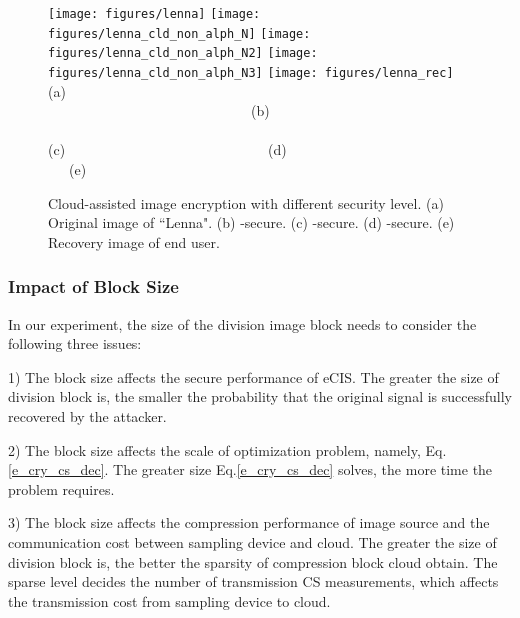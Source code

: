 \documentclass[conference]{IEEEtran}
\begin{document}
\begin{figure*}[t]
\begin{center}
  \texttt{[image: figures/lenna]}
  \texttt{[image: figures/lenna\_cld\_non\_alph\_N]}
  \texttt{[image: figures/lenna\_cld\_non\_alph\_N2]}
  \texttt{[image: figures/lenna\_cld\_non\_alph\_N3]}
  \texttt{[image: figures/lenna\_rec]}\\
 {\footnotesize (a) ~~~~~~~~~~~~~~~~~~~~~~~~~~~~~(b)~~~~~~~~~~~~~~~~~~~~~~~~~~~~~ (c)~~~~~~~~~~~~~~~~~~~~~~~~~~~~~(d)~~~~~~~~~~~~~~~~~~~~~~~~~~~~~(e) }\\
  \caption{{\footnotesize Cloud-assisted image encryption with different security level. (a) Original image of ``Lenna". (b) -secure. (c)  -secure. (d)  -secure. (e) Recovery image of end user.}}\label{f_se_uniform}
  \end{center}
\end{figure*}

\subsubsection{Impact of Block Size}
In our experiment, the size of the division image block needs to consider the following three issues:

 1) The block size affects the secure performance of eCIS. The greater the size of division block is, the smaller the probability that the original signal is successfully recovered by the attacker.

 2) The block size  affects the scale of  optimization problem, namely, Eq.\ref{e_cry_cs_dec}. The greater size  Eq.\ref{e_cry_cs_dec}  solves, the more time the problem requires.

 3) The block size affects the compression performance of image source and the communication cost between sampling device and cloud. The greater the size of division block is, the better the sparsity of compression block cloud obtain. The sparse level decides the number of transmission CS measurements, which affects the transmission cost from sampling device to cloud.
\end{document}
